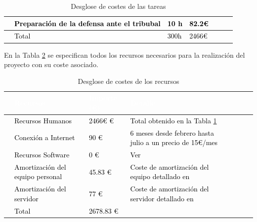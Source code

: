 \begin{table}[H]
\begin{adjustbox}{max height=\textheight,max width=\textwidth}
\begin{tabular}{|clllrrl|}
    \hline
    \rowcolor{white} \multicolumn{1}{|l}{}  & \textcolor{black}{Preparación de la defensa ante el tribubal} & \textcolor{black}{10 h}         & \textcolor{black}{82.2€} &\\                                  
    \hline
    \rowcolor{white} \multicolumn{1}{|l}{}  & \textcolor{black}{Total} & \textcolor{black}{300h}         & \textcolor{black}{2466€} &\\                                  
    \hline
    \end{tabular}
    \end{adjustbox}
    \caption{Desglose de costes de las tareas}
    \label{fig:CosteTareas}
\end{table}

En la Tabla \ref{fig:CosteRecursos} se especifican todos los recursos necesarios para la realización del proyecto con su coste asociado.

\begin{table}[H]
    \centering
    \begin{adjustbox}{max height=\textheight, max width=\textwidth}
    \begin{tabular}{|clllrrl|} 
    \hline
    \rowcolor{black} \multicolumn{1}{|l}{}  & \textcolor{white}{Recursos} & \textcolor{white}{Importe (€)}         & \textcolor{white}{Detalle} \\                                      
    \hline
    \rowcolor{white} \multicolumn{1}{|l}{}  & \textcolor{black}{Recursos Humanos} & \textcolor{black}{2466€ €}         & \textcolor{black}{Total obtenido en la Tabla \ref{fig:CosteTareas}} &\\
    \hline
    \rowcolor{white} \multicolumn{1}{|l}{}  & \textcolor{black}{Conexión a Internet} & \textcolor{black}{90 €}         & \textcolor{black}{6 meses desde febrero hasta julio a un precio de 15€/mes } &\\
    \hline
    \rowcolor{white} \multicolumn{1}{|l}{}  & \textcolor{black}{Recursos Software} & \textcolor{black}{0 €}         & \textcolor{black}{Ver \textit{\nameref{RecursosSoftware}}} &\\
    \hline
    \rowcolor{white} \multicolumn{1}{|l}{}  & \textcolor{black}{Amortización del equipo personal} & \textcolor{black}{45.83 €}         & \textcolor{black}{Coste de amortización del equipo detallado en \textit{\nameref{RecursosHardware}}} &\\
    \hline
    \rowcolor{white} \multicolumn{1}{|l}{}  & \textcolor{black}{Amortización del servidor} & \textcolor{black}{77 €}         & \textcolor{black}{Coste de amortización del servidor detallado en \textit{\nameref{RecursosHardware}}} &\\
    \hline
    \rowcolor{white} \multicolumn{1}{|l}{}  & \textcolor{black}{Total} & \textcolor{black}{2678.83 €}         & \textcolor{black}{} &\\
    \hline
    \end{tabular}
    \end{adjustbox}
    \caption{Desglose de costes de los recursos}
    \label{fig:CosteRecursos}
\end{table}
